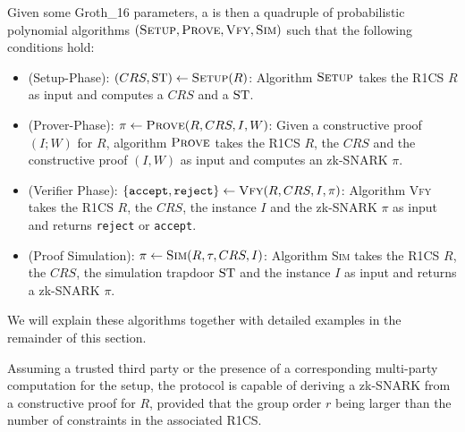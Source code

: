 Given some Groth\_16 parameters, a  is then a quadruple of probabilistic polynomial algorithms $(\textsc{Setup},\textsc{Prove},\textsc{Vfy},\textsc{Sim})$ such that the following conditions hold:
\begin{itemize}
\item (Setup-Phase): $(CRS,\mathrm{ST})\leftarrow \textsc{Setup}(R)$: Algorithm $\textsc{Setup}$ takes the R1CS $R$ as input and computes a  $CRS$ and a  $\mathrm{ST}$.
\item (Prover-Phase): $\pi\leftarrow \textsc{Prove}(R,CRS,I,W)$: Given a constructive proof $(I;W)$ for $R$, algorithm $\textsc{Prove}$ takes the R1CS $R$, the  $CRS$ and the constructive proof $(I,W)$ as input and computes an zk-SNARK $\pi$.
\item (Verifier Phase): $\{\mathtt{accept},\mathtt{reject}\}\leftarrow \textsc{Vfy}(R,CRS,I,\pi)$:   Algorithm \textsc{Vfy} takes the R1CS $R$, the  $CRS$, the instance $I$ and the zk-SNARK $\pi$ as input and returns \texttt{reject} or \texttt{accept}.
\item (Proof Simulation): $\pi\leftarrow \textsc{Sim}(R,\tau,CRS, I)$: Algorithm \textsc{Sim} takes the R1CS $R$, the  $CRS$, the simulation trapdoor $\mathrm{ST}$ and the instance $I$ as input and returns a zk-SNARK $\pi$. 
\end{itemize}
We will explain these algorithms together with detailed examples in the remainder of this section.

Assuming a trusted third party or the presence of a corresponding multi-party computation for the setup, the protocol is capable of deriving a zk-SNARK from a constructive proof for $R$, provided that the group order $r$ being larger than the number of constraints in the associated R1CS.

